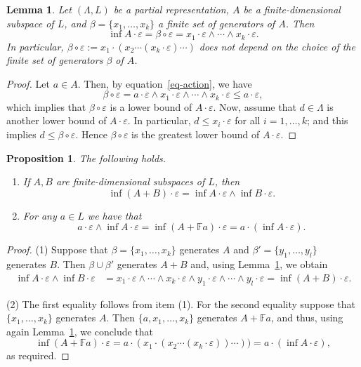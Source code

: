 \documentclass{amsart}
\newcommand{\F}{\mathbb{F}}
\newcommand{\0}{{\vartheta}}
\newtheorem{lem}[thm]{Lemma}
\newtheorem{prop}[thm]{Proposition}
\theoremstyle{definition}
\theoremstyle{remark}
\numberwithin{equation}{section}
\newtheorem*{Theorem A}{\textbf{Theorem A}}
\newtheorem*{Corollary E}{\textbf{Corollary E}}
\newtheorem*{Corollary F}{\textbf{Corollary F}}
\newtheorem*{Theorem B}{\textbf{Theorem B}}
\newtheorem*{Theorem C}{\textbf{Theorem C}}
\newtheorem*{Theorem D}{\textbf{Theorem B}}
\newtheorem*{p a}{\textbf{Proof of  Theorem A}}
\newtheorem*{p b}{\textbf{Proof of Theorem B}}
\newtheorem*{p c}{\textbf{Proof of  Theorem C}}
\newtheorem*{p d}{\textbf{Proof of  Theorem D}}
\begin{document}
\begin{lem}\label{lemma:F-pair}
Let $(\Lambda,L)$ be a partial representation, $A$ be a finite-dimensional subspace of $L$, and $\beta=\{x_1,\ldots,x_k\}$ a finite set of generators of $A$. Then
$$\inf A\cdot\varepsilon=\beta\circ\varepsilon=x_1\cdot\varepsilon\wedge\cdots \wedge x_k\cdot \varepsilon.$$
In particular, $\beta\circ \varepsilon:=
x_1\cdot(x_2\cdots(x_k\cdot \varepsilon ) \cdots )$ does not depend on the choice of the  finite set of generators $\beta$ of $A$. 
\end{lem}
\begin{proof}
Let $a\in A$. Then, by equation~\eqref{eq-action}, we have  
$$\beta\circ \varepsilon=a\cdot \varepsilon\wedge x_1\cdot\varepsilon\wedge\cdots \wedge x_k\cdot \varepsilon\leq a\cdot \varepsilon,$$
which implies that $\beta\circ \varepsilon$ is a lower bound of $A\cdot \varepsilon$. Now, assume that $d\in \Lambda$ is another lower bound of $A\cdot \varepsilon$. In particular, $d\leq x_i\cdot \varepsilon$ for all $i=1,\ldots, k$; and this implies $d\leq \beta\circ \varepsilon$. Hence $\beta\circ\varepsilon$ is the greatest lower bound of $A\cdot \varepsilon$. 
\end{proof}
\begin{prop}\label{prop-inf} The following holds.
\begin{enumerate}
    \item If $A,B$ are finite-dimensional subspaces of $L$, then $$\inf(A+B)\cdot \varepsilon=\inf A\cdot \varepsilon\wedge \inf B\cdot \varepsilon.$$
    \item For any  $a\in L$ we have that $$a\cdot \varepsilon \wedge \inf A\cdot \varepsilon =\inf (A+\F a)\cdot \varepsilon=a\cdot (\inf A\cdot \varepsilon).$$
\end{enumerate}
\end{prop}
\begin{proof}
(1) Suppose  that $\beta=\{x_1,\ldots,x_k\}$ generates  $A$ and $\beta'=\{y_1,\ldots,y_l\}$ generates $B$. Then $\beta\cup \beta'$ generates $A+B$  and, using Lemma~\ref{lemma:F-pair}, we obtain 
\begin{align*}
\inf A\cdot \varepsilon\wedge \inf B\cdot \varepsilon &=x_1\cdot \varepsilon\wedge\cdots\wedge x_k\cdot \varepsilon \wedge y_1\cdot \varepsilon\wedge\cdots \wedge y_l\cdot \varepsilon= \inf (A+B)\cdot \varepsilon.
\end{align*}

(2) The first equality follows from item (1). For the second equality suppose that $\{x_1,\ldots,x_k\}$ generates $A$. Then $\{a,x_1,\ldots,x_k\}$ generates $A+\F a$, and thus, using again Lemma~\ref{lemma:F-pair}, we conclude that
$$\inf (A+\F a)\cdot \varepsilon=a\cdot(x_1\cdot(x_2\cdots(x_k\cdot \varepsilon))\cdots))=a\cdot(\inf A\cdot \varepsilon),$$
as required.
\end{proof}
\end{document}
